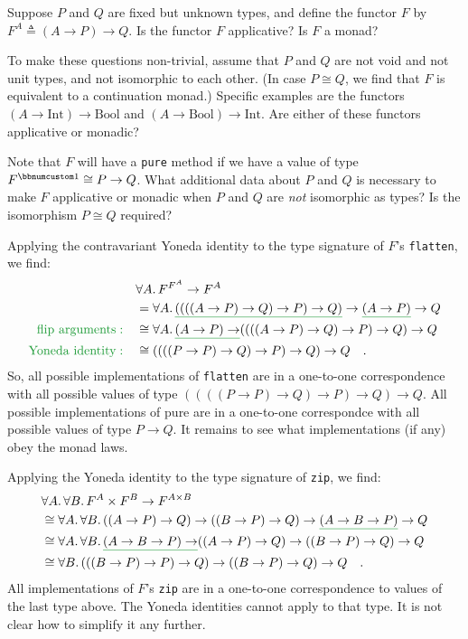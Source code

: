 Suppose $P$ and $Q$ are fixed but unknown types, and define the
functor $F$ by $F^{A}\triangleq(A\rightarrow P)\rightarrow Q$. Is
the functor $F$ applicative? Is $F$ a monad?

To make these questions non-trivial, assume that $P$ and $Q$ are
not void and not unit types, and not isomorphic to each other. (In
case $P\cong Q$, we find that $F$ is equivalent to a continuation
monad.) Specific examples are the functors $(A\rightarrow\text{Int})\rightarrow\text{Bool}$
and $(A\rightarrow\text{Bool})\rightarrow\text{Int}$. Are either
of these functors applicative or monadic?

Note that $F$ will have a \lstinline!pure! method if we have a value
of type $F^{\bbnum 1}\cong P\rightarrow Q$. What additional data
about $P$ and $Q$ is necessary to make $F$ applicative or monadic
when $P$ and $Q$ are \emph{not} isomorphic as types? Is the isomorphism
$P\cong Q$ required?

Applying the contravariant Yoneda identity to the type signature of
$F$\textsf{'}s \lstinline!flatten!, we find:
\begin{align*}
 & \forall A.\,F^{F^{A}}\rightarrow F^{A}\\
 & =\forall A.\,\gunderline{((((A\rightarrow P)\rightarrow Q)\rightarrow P)\rightarrow Q)}\rightarrow\gunderline{(A\rightarrow P)}\rightarrow Q\\
{\color{greenunder}\text{flip arguments}:}\quad & \cong\forall A.\,\gunderline{(A\rightarrow P)\rightarrow}((((A\rightarrow P)\rightarrow Q)\rightarrow P)\rightarrow Q)\rightarrow Q\\
{\color{greenunder}\text{Yoneda identity}:}\quad & \cong((((P\rightarrow P)\rightarrow Q)\rightarrow P)\rightarrow Q)\rightarrow Q\quad.
\end{align*}
So, all possible implementations of \lstinline!flatten! are in a
one-to-one correspondence with all possible values of type $((((P\rightarrow P)\rightarrow Q)\rightarrow P)\rightarrow Q)\rightarrow Q$.
All possible implementations of pure are in a one-to-one correspondce
with all possible values of type $P\rightarrow Q$. It remains to
see what implementations (if any) obey the monad laws.

Applying the Yoneda identity to the type signature of \lstinline!zip!,
we find:
\begin{align*}
 & \forall A.\,\forall B.\,F^{A}\times F^{B}\rightarrow F^{A\times B}\\
 & \cong\forall A.\,\forall B.\,((A\rightarrow P)\rightarrow Q)\rightarrow((B\rightarrow P)\rightarrow Q)\rightarrow\gunderline{(A\rightarrow B\rightarrow P)}\rightarrow Q\\
 & \cong\forall A.\,\forall B.\,\gunderline{(A\rightarrow B\rightarrow P)\rightarrow}((A\rightarrow P)\rightarrow Q)\rightarrow((B\rightarrow P)\rightarrow Q)\rightarrow Q\\
 & \cong\forall B.\,(((B\rightarrow P)\rightarrow P)\rightarrow Q)\rightarrow((B\rightarrow P)\rightarrow Q)\rightarrow Q\quad.
\end{align*}
All implementations of $F$\textsf{'}s \lstinline!zip! are in a one-to-one
correspondence to values of the last type above. The Yoneda identities
cannot apply to that type. It is not clear how to simplify it any
further.

